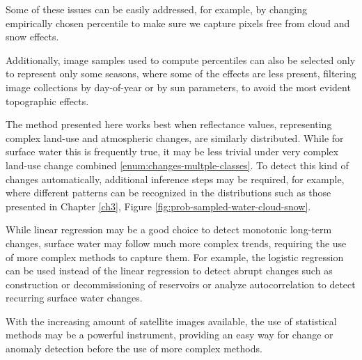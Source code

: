 Some of these issues can be easily addressed, for example, by changing empirically chosen percentile to make sure we capture pixels free from cloud and snow effects.

Additionally, image samples used to compute percentiles can also be selected only to represent only some seasons, where some of the effects are less present, filtering image collections by day-of-year or by sun parameters, to avoid the most evident topographic effects. 

The method presented here works best when reflectance values, representing complex land-use and atmospheric changes, are similarly distributed. While for surface water this is frequently true, it may be less trivial under very complex land-use change combined \ref{enum:changes-multple-classes}. To detect this kind of changes automatically, additional inference steps may be required, for example, where different patterns can be recognized in the distributions such as those presented in Chapter \ref{ch3}, Figure \ref{fig:prob-sampled-water-cloud-snow}.

While linear regression may be a good choice to detect monotonic long-term changes, surface water may follow much more complex trends, requiring the use of more complex methods to capture them. For example, the logistic regression can be used instead of the linear regression to detect abrupt changes such as construction or decommissioning of reservoirs or analyze autocorrelation to detect recurring surface water changes.

With the increasing amount of satellite images available, the use of statistical methods may be a powerful instrument, providing an easy way for change or anomaly detection before the use of more complex methods.


